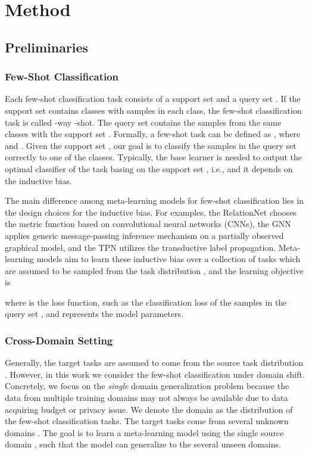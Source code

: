 \documentclass{article}
\begin{document}
\section{Method}
\subsection{Preliminaries}
\subsubsection{Few-Shot Classification} 
Each few-shot classification task  consists of a support set  and a query set . If the support set  contains  classes with  samples in each class, the few-shot classification task is called -way -shot. The query set  contains the samples from the same classes with the support set . Formally, a few-shot task can be defined as , where  and . Given the support set , our goal is to classify the samples in the query set  correctly to one of the  classes. Typically, the base learner  is needed to output the optimal classifier  of the task basing on the support set , i.e.,  and it depends on the inductive bias.

The main difference among meta-learning models for few-shot classification lies in the design choices for the inductive bias. For examples, the RelationNet \cite{sung2018learning} chooses the metric function based on convolutional neural networks (CNNs), the GNN \cite{garcia2018few} applies generic message-passing inference mechanism on a partially observed graphical model, and the TPN \cite{liu2019learning} utilizes the transductive label propagation. Meta-learning models aim to learn these inductive bias over a collection of tasks which are assumed to be sampled from the task distribution , and the learning objective is

where  is the loss function, such as the classification loss of the samples in the query set , and  represents the model parameters.

\subsubsection{Cross-Domain Setting}
Generally, the target tasks are assumed to come from the source task distribution . However, in this work we consider the few-shot classification under domain shift. Concretely, we focus on the \emph{single} domain generalization problem because the data from multiple training domains may not always be available due to data acquiring budget or privacy issue. We denote the domain as the distribution of the few-shot classification tasks. The target tasks come from several unknown domains . The goal is to learn a meta-learning model using the single source domain , such that the model can generalize to the several unseen domains.
\end{document}
